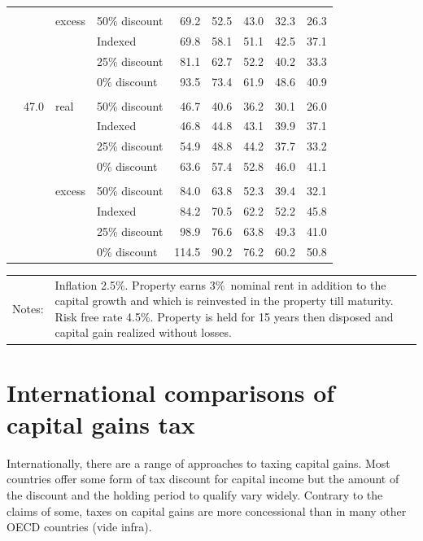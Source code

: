 \begin{subappendices}
\begin{table}
{\begin{tabular}{Qlllrrrrr}
  &\phantom{.}\\[-9pt] &  & excess & 50\% discount & 69.2 & 52.5 & 43.0 & 32.3 & 26.3 \\ 
   &  &  & Indexed & 69.8 & 58.1 & 51.1 & 42.5 & 37.1 \\ 
   &  &  & 25\% discount & 81.1 & 62.7 & 52.2 & 40.2 & 33.3 \\ 
   &  &  & 0\% discount & 93.5 & 73.4 & 61.9 & 48.6 & 40.9 \\ 
  &\phantom{.}\\[-6pt] & 47.0 & real & 50\% discount & 46.7 & 40.6 & 36.2 & 30.1 & 26.0 \\ 
   &  &  & Indexed & 46.8 & 44.8 & 43.1 & 39.9 & 37.1 \\ 
   &  &  & 25\% discount & 54.9 & 48.8 & 44.2 & 37.7 & 33.2 \\ 
   &  &  & 0\% discount & 63.6 & 57.4 & 52.8 & 46.0 & 41.1 \\ 
  &\phantom{.}\\[-9pt] &  & excess & 50\% discount & 84.0 & 63.8 & 52.3 & 39.4 & 32.1 \\ 
   &  &  & Indexed & 84.2 & 70.5 & 62.2 & 52.2 & 45.8 \\ 
   &  &  & 25\% discount & 98.9 & 76.6 & 63.8 & 49.3 & 41.0 \\ 
   &  &  & 0\% discount & 114.5 & 90.2 & 76.2 & 60.2 & 50.8 \\ 
   \bottomrule
\end{tabular}}

\begin{tabular}{lp{\textwidth}}
\footnotesize Notes: & {\footnotesize Inflation 2.5\%. Property earns 3\%\ nominal rent in addition to the capital growth and which is reinvested in the property till maturity. Risk free rate 4.5\%. Property is held for 15 years then disposed and capital gain realized without losses.}
\end{tabular}
\end{table}

\chapter{International comparisons of capital gains tax}\label{appendix:Intl-comparisons-of-CGT}
Internationally, there are a range of approaches to taxing capital gains. Most countries offer some form of tax discount for capital income but the amount of the discount and the holding period to qualify vary widely. Contrary to the claims of some, taxes on capital gains are more concessional than in many other OECD countries (vide infra).


\end{subappendices}

